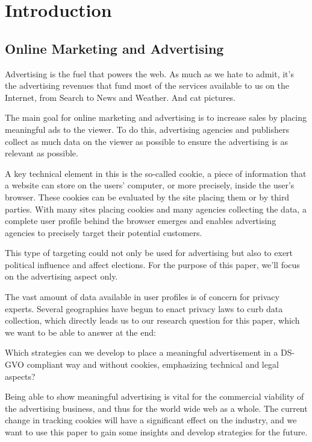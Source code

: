 %
%

\pagebreak
\section{Introduction}

\onehalfspacing

\subsection{Online Marketing and Advertising}

Advertising is the fuel that powers the web. As much as we hate to admit, it's the advertising revenues that fund most of the services available to us on the Internet, from Search to News and Weather. And cat pictures.

The main goal for online marketing and advertising is to increase sales by placing meaningful ads to the viewer. To do this, advertising agencies and publishers collect as much data on the viewer as possible to ensure the advertising is as relevant as possible.

A key technical element in this is the so-called cookie, a piece of information that a website can store on the users' computer, or more precisely, inside the user's browser. These cookies can be evaluated by the site placing them or by third parties. With many sites placing cookies and many agencies collecting the data, a complete user profile behind the browser emerges and enables advertising agencies to precisely target their potential customers.

This type of targeting could not only be used for advertising but also to exert political influence and affect elections. For the purpose of this paper, we'll focus on the advertising aspect only. 

The vast amount of data available in user profiles is of concern for privacy experts. Several geographies have begun to enact privacy laws to curb data collection, which directly leads us to our research question for this paper, which we want to be able to answer at the end: 

Which strategies can we develop to place a meaningful advertisement in a DS-GVO compliant way and without cookies, emphasizing technical and legal aspects?

Being able to show meaningful advertising is vital for the commercial viability of the advertising business, and thus for the world wide web as a whole. The current change in tracking cookies will have a significant effect on the industry, and we want to use this paper to gain some insights and develop strategies for the future.

